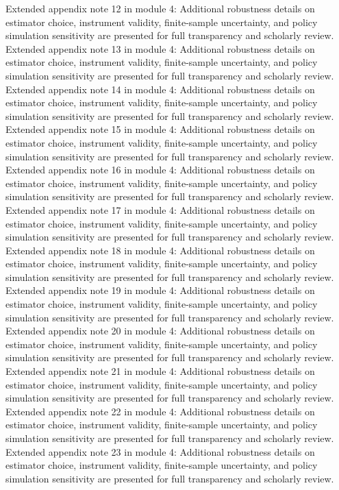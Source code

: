 \documentclass[preprint,12pt]{elsarticle}
\begin{document}
Extended appendix note 12 in module 4: Additional robustness details on estimator choice, instrument validity, finite-sample uncertainty, and policy simulation sensitivity are presented for full transparency and scholarly review.
Extended appendix note 13 in module 4: Additional robustness details on estimator choice, instrument validity, finite-sample uncertainty, and policy simulation sensitivity are presented for full transparency and scholarly review.
Extended appendix note 14 in module 4: Additional robustness details on estimator choice, instrument validity, finite-sample uncertainty, and policy simulation sensitivity are presented for full transparency and scholarly review.
Extended appendix note 15 in module 4: Additional robustness details on estimator choice, instrument validity, finite-sample uncertainty, and policy simulation sensitivity are presented for full transparency and scholarly review.
Extended appendix note 16 in module 4: Additional robustness details on estimator choice, instrument validity, finite-sample uncertainty, and policy simulation sensitivity are presented for full transparency and scholarly review.
Extended appendix note 17 in module 4: Additional robustness details on estimator choice, instrument validity, finite-sample uncertainty, and policy simulation sensitivity are presented for full transparency and scholarly review.
Extended appendix note 18 in module 4: Additional robustness details on estimator choice, instrument validity, finite-sample uncertainty, and policy simulation sensitivity are presented for full transparency and scholarly review.
Extended appendix note 19 in module 4: Additional robustness details on estimator choice, instrument validity, finite-sample uncertainty, and policy simulation sensitivity are presented for full transparency and scholarly review.
Extended appendix note 20 in module 4: Additional robustness details on estimator choice, instrument validity, finite-sample uncertainty, and policy simulation sensitivity are presented for full transparency and scholarly review.
Extended appendix note 21 in module 4: Additional robustness details on estimator choice, instrument validity, finite-sample uncertainty, and policy simulation sensitivity are presented for full transparency and scholarly review.
Extended appendix note 22 in module 4: Additional robustness details on estimator choice, instrument validity, finite-sample uncertainty, and policy simulation sensitivity are presented for full transparency and scholarly review.
Extended appendix note 23 in module 4: Additional robustness details on estimator choice, instrument validity, finite-sample uncertainty, and policy simulation sensitivity are presented for full transparency and scholarly review.
\end{document}
